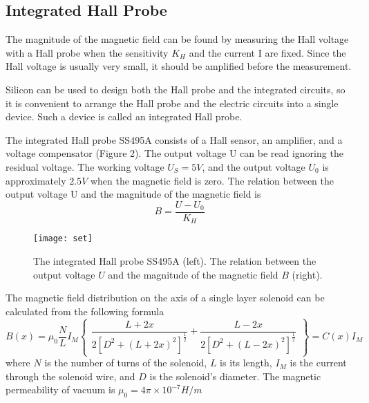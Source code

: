 \documentclass[a4paper,12pt]{article}
\begin{document}
\subsection{Integrated Hall Probe}
The magnitude of the magnetic field can be found by measuring the Hall voltage with a Hall probe when the sensitivity $ K_H $ and the current I are fixed. Since the Hall voltage is usually very small, it should be amplified before the measurement.

Silicon can be used to design both the Hall probe and the integrated circuits, so it is convenient to arrange the Hall probe and the electric circuits into a single device. Such a device is called an integrated Hall probe.

The integrated Hall probe SS495A consists of a Hall sensor, an amplifier, and a voltage compensator (Figure 2). The output voltage U can be read ignoring the residual voltage. The working voltage $ U_S = 5 V $, and the output voltage $ U_0 $ is approximately $ 2.5 V $ when the magnetic field is zero. The relation between the output voltage U and the magnitude of the magnetic field is
\begin{equation}
	B=\dfrac{U-U_0}{K_H}
\end{equation}
\begin{figure}[H]
	\centering
	\texttt{[image: set]}
	\caption{The integrated Hall probe SS495A (left). The relation between the output voltage $ U $ and the magnitude of the magnetic field $ B $ (right).}
\end{figure}
The magnetic field distribution on the axis of a single layer solenoid can be calculated from the following formula
\begin{equation}
	B(x)=\mu_0\dfrac{N}{L}I_M\begin{Bmatrix}
	\dfrac{L+2x}{2[D^2+(L+2x)^2]^{\frac{1}{2}}}+\dfrac{L-2x}{2[D^2+(L-2x)^2]^{\frac{1}{2}}}
	\end{Bmatrix}=C(x)I_M
\end{equation}
where $ N $ is the number of turns of the solenoid, $ L $ is its length, $ I_M $ is the current through the solenoid wire, and $ D $ is the solenoid's diameter. The magnetic permeability of vacuum is $ \mu_0=4\pi\times10^{-7}H/m $
\end{document}
